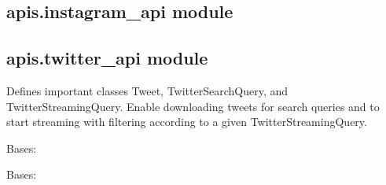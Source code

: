 \documentclass[letterpaper,10pt,english]{sphinxmanual}
\begin{document}
\subsection{apis.instagram\_api module}
\label{apis:apis-instagram-api-module}\label{apis:module-apis.instagram_api}

\subsection{apis.twitter\_api module}
\label{apis:module-apis.twitter_api}\label{apis:apis-twitter-api-module}
Defines important classes Tweet, TwitterSearchQuery, and TwitterStreamingQuery. Enable downloading tweets for search queries and to start streaming with filtering according to a given TwitterStreamingQuery.

\begin{fulllineitems}
\label{apis:apis.twitter_api.PrintingListener}
Bases: {\hyperref[apis:apis.twitter_api.TwitterStreamListener]{\emph{}}}

\begin{fulllineitems}
\label{apis:apis.twitter_api.PrintingListener.on_status}
\end{fulllineitems}


\end{fulllineitems}


\begin{fulllineitems}
\label{apis:apis.twitter_api.StoringListener}
Bases: {\hyperref[apis:apis.twitter_api.TwitterStreamListener]{\emph{}}}

\begin{fulllineitems}
\label{apis:apis.twitter_api.StoringListener.on_connect}
\end{fulllineitems}


\begin{fulllineitems}
\label{apis:apis.twitter_api.StoringListener.on_status}
\end{fulllineitems}


\end{fulllineitems}
\end{document}
